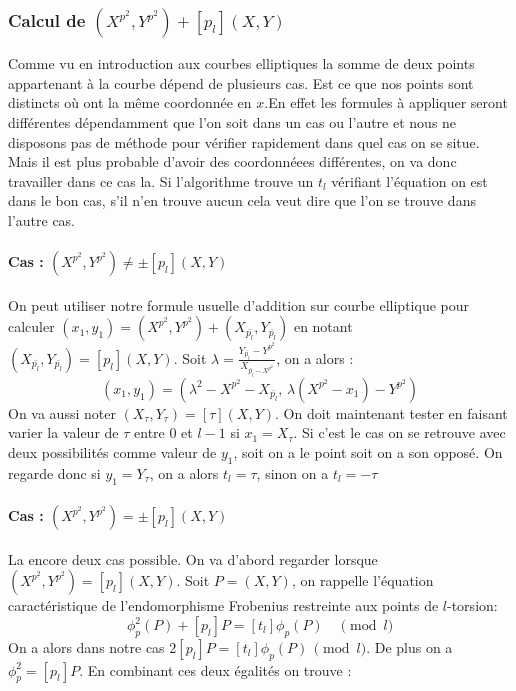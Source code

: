 \documentclass{article}
\begin{document}
\subsubsection{Calcul de $(X^{p^2}, Y^{p^2}) + [p_l](X,Y)$}

Comme vu en introduction aux courbes elliptiques la somme de deux points appartenant à la courbe dépend de plusieurs cas. Est ce que nos points sont distincts où ont la même coordonnée en $x$.En effet les formules à appliquer seront différentes dépendamment que l'on soit dans un cas ou l'autre et nous ne disposons pas de méthode pour vérifier rapidement dans quel cas on se situe. Mais il est plus probable d'avoir des coordonnéees différentes, on va donc travailler dans ce cas la. Si l'algorithme trouve un $t_l$ vérifiant l'équation on est dans le bon cas, s'il n'en trouve aucun cela veut dire que l'on se trouve dans l'autre cas.
\paragraph*{Cas : $(X^{p^2}, Y^{p^2}) \ne \pm [p_l](X,Y)$}

On peut utiliser notre formule usuelle d'addition sur courbe elliptique pour calculer $(x_1, y_1) = (X^{p^2}, Y^{p^2}) + (X_{\bar{p_l}}, Y_{\bar{p_l}})$ en notant $(X_{\bar{p_l}}, Y_{\bar{p_l}}) =  [p_l](X,Y)$. 
\newline
Soit $\lambda = \frac{Y_{\bar{p_l}} - Y^{p^2}}{X_{\bar{p_l} - X^{p^2}}}$, on a alors :
\begin{equation}
(x_1, y_1) = (\lambda^2 - X^{p^2} - X_{\bar{p_l}}, \, \lambda (X^{p^2} - x_1) -  Y^{p^2})
\end{equation}
On va aussi noter $(X_{\tau}, Y_{\tau}) =  [\tau](X,Y)$. On doit maintenant tester en faisant varier la valeur de $\tau$ entre $0$ et $l -1$ si $x_1 = X_{\tau}$. Si c'est le cas on se retrouve avec deux possibilités comme valeur de $y_1$, soit on a le point soit on a son opposé. On regarde donc si $y_1 = Y_{\tau}$, on a alors $t_l = \tau$, sinon on a $t_l = - \tau$

\paragraph*{Cas : $(X^{p^2}, Y^{p^2}) = \pm [p_l](X,Y)$}
La encore deux cas possible. On va d'abord regarder lorsque $(X^{p^2}, Y^{p^2}) = [p_l](X,Y)$. 
\newline
Soit $P=(X,Y)$, on rappelle l’équation caractéristique de l'endomorphisme Frobenius restreinte aux points de $l$-torsion: 
\begin{equation}
\phi_p^2(P)  + [p_l]P = [t_{l}] \phi_p(P) \quad \pmod{l}
\end{equation}
On a alors dans notre cas $2[p_l]P = [t_{l}] \phi_p(P) \, \pmod{l}$. De plus on a $\phi_p^2 = [p_l]P$. En combinant ces deux égalités on trouve :
\end{document}
